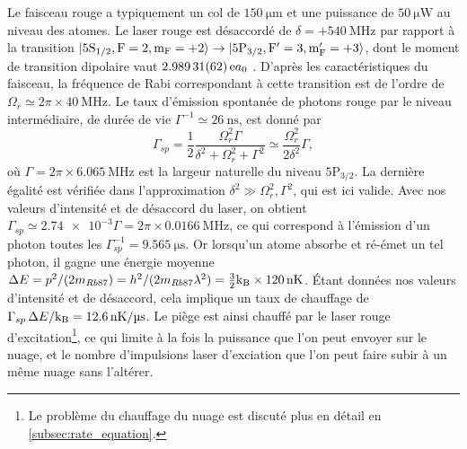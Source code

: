 Le faisceau rouge a typiquement un col de $\SI{150}{\um}$ et une puissance de $\SI{50}{\micro\watt}$ au niveau des atomes.
Le laser rouge est désaccordé de $\delta=+\SI{540}{\MHz}$ par rapport à la transition $ \ket{\mathrm{5S_{1/2},F=2,m_F=+2}} \rightarrow \ket{\mathrm{5P_{3/2},F'=3,m_F'=+3}}$, dont le moment de transition dipolaire vaut $\SI{2.98931 (62)} ea_0$ \cite{DATA_STECKRB87}.
D'après les caractéristiques du faisceau, la fréquence de Rabi correspondant à cette transition est de l'ordre de $\Omega_r \simeq 2\pi\times \SI{40}{\MHz}$.
Le taux d'émission spontanée de photons rouge par le niveau intermédiaire, de durée de vie $\Gamma^{-1} \simeq \SI{26}{\ns}$, est donné par
\begin{equation}
\label{eq:scattering_5P3/2}
\Gamma_{sp} = \frac{1}{2} \frac{\Omega_r^2 \Gamma}{\delta^2 + \Omega_r^2 + \Gamma^2}
\simeq \frac{\Omega_r^2}{2\delta^2} \Gamma,
\end{equation}
où $\Gamma = 2\pi \times \SI{6.065}{\MHz}$ est la largeur naturelle du niveau $\mathrm{5P_{3/2}}$.
La dernière égalité est vérifiée dans l'approximation $\delta^2 \gg \Omega_r^2, \Gamma^2$, qui est ici valide.
Avec nos valeurs d'intensité et de désaccord du laser, on obtient $\Gamma_{sp} \simeq \num{2.74e-3} \Gamma = 2\pi\times \SI{0.0166}{\MHz}$, ce qui correspond à l'émission d'un photon  toutes les $\Gamma_{sp}^{-1} = \SI{9.565}{\us}$.
Or lorsqu'un atome absorbe et ré-émet un tel photon, il gagne une énergie moyenne
$\Delta E = p^2/(2m_{Rb87}) = h^2/(2m_{Rb87} \lambda^2) = \frac{3}{2}\mathrm{k_B}\times\SI{120}{\nano\kelvin}$.
Étant données nos valeurs d'intensité et de désaccord, cela implique un taux de chauffage de $\Gamma_{sp}\,\Delta E /\kb = \SI{12.6}{\nano\K/\us}$.
Le piège est ainsi chauffé par le laser rouge d'excitation\footnote{
Le problème du chauffage du nuage est discuté plus en détail en \ref{subsec:rate_equation}.
}, ce qui limite à la fois la puissance que l'on peut envoyer sur le nuage, et le nombre d'impulsions laser d'exciation que l'on peut faire subir à un même nuage sans l'altérer.

